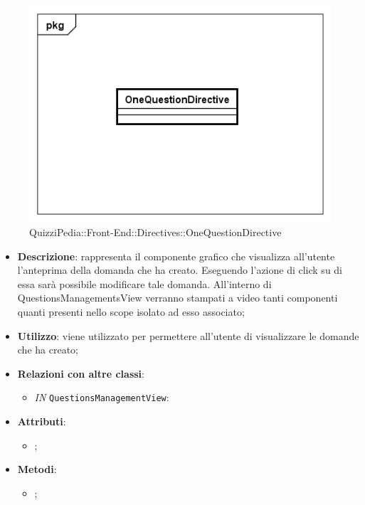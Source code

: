 \label{QuizziPedia::Front-End::Directives::OneQuestionDirective}

\begin{figure}[h]
	\centering
	\includegraphics[scale=0.5,keepaspectratio]{UML/Classi/Front-End/QuizziPedia_Front-end_Directives_OneQuestionDirective.png}
	\caption{QuizziPedia::Front-End::Directives::OneQuestionDirective}
\end{figure}

\begin{itemize}
	\item \textbf{Descrizione}: rappresenta il componente grafico che visualizza all'utente l'anteprima della domanda che ha creato. Eseguendo l'azione di click su di essa sarà possibile modificare tale domanda. All'interno di QuestionsManagementsView verranno stampati a video tanti componenti quanti presenti nello scope isolato ad esso associato;
	\item \textbf{Utilizzo}: viene utilizzato per permettere all'utente di visualizzare le domande che ha creato;
	\item \textbf{Relazioni con altre classi}: 
	\begin{itemize}
		\item \textit{IN} \texttt{QuestionsManagementView}: 
	\end{itemize}
	\item \textbf{Attributi}: 
	\begin{itemize}
		\item ;
	\end{itemize}
	\item \textbf{Metodi}: 
	\begin{itemize}
		\item ;
	\end{itemize}
\end{itemize}

